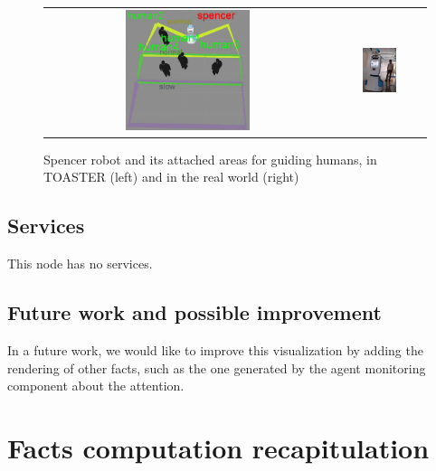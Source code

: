 \documentclass[a4paper]{article}
\begin{document}
 \begin{figure}[ht!]
 \centering
 \begin{tabular}{cc}
  \includegraphics[width=0.45\textwidth]{img/toaster_spencer.jpg} &
  \includegraphics[width=0.4\textwidth]{img/spencer_guidingShrink.png}
 \end{tabular}
 \caption{Spencer robot and its attached areas for guiding humans, in TOASTER (left) and in the real world (right)}
 \label{fig:spencer}
   \vspace{-10pt}
 \end{figure}
\subsection{Services}
This node has no services.

\subsection{Future work and possible improvement}
In a future work, we would like to improve this visualization by adding the rendering of other facts, such as the one generated by the agent monitoring component about the attention.


\section{Facts computation recapitulation}
\end{document}
